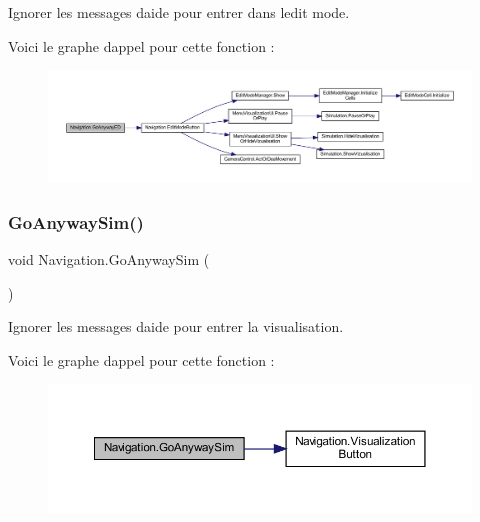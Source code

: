 Ignorer les messages d\textquotesingle{}aide pour entrer dans l\textquotesingle{}edit mode. 

Voici le graphe d\textquotesingle{}appel pour cette fonction \+:\nopagebreak
\begin{figure}[H]
\begin{center}
\leavevmode
\includegraphics[width=350pt]{class_navigation_a17942535e76d66a1d290f9e7a2bc03ec_cgraph}
\end{center}
\end{figure}
\mbox{\label{class_navigation_a4ea15dd4ea6a5789b4786150d534fc10}} 
\subsubsection{\texorpdfstring{Go\+Anyway\+Sim()}{GoAnywaySim()}}
{\footnotesize\ttfamily void Navigation.\+Go\+Anyway\+Sim (\begin{DoxyParamCaption}{ }\end{DoxyParamCaption})\hspace{0.3cm}{\ttfamily [inline]}}



Ignorer les messages d\textquotesingle{}aide pour entrer la visualisation. 

Voici le graphe d\textquotesingle{}appel pour cette fonction \+:\nopagebreak
\begin{figure}[H]
\begin{center}
\leavevmode
\includegraphics[width=350pt]{class_navigation_a4ea15dd4ea6a5789b4786150d534fc10_cgraph}
\end{center}
\end{figure}
\mbox{\label{class_navigation_a9a7bb527269069e0c083ef70291d4fb3}} 

